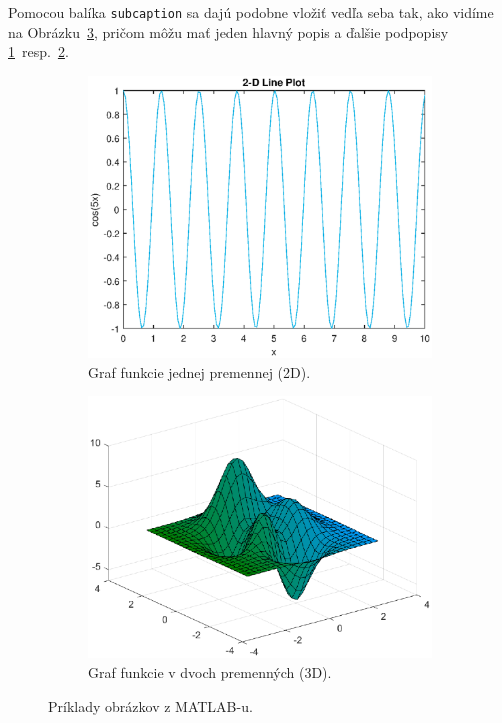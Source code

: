 Pomocou balíka \verb|subcaption| sa dajú podobne vložiť vedľa seba tak, ako vidíme na Obrázku~\ref{fig:matlab}, pričom môžu mať jeden hlavný popis a ďalšie podpopisy \ref{fig:matlab_2D}~resp.~\ref{fig:matlab_3D}.
\begin{figure}[h!]
	\centering
	\begin{subfigure}[b]{0.45\textwidth}
		\includegraphics[width=\textwidth]{matlab_2D}
		\caption{Graf funkcie jednej premennej (2D).}
		\label{fig:matlab_2D}
	\end{subfigure}
	\qquad
	\begin{subfigure}[b]{0.45\textwidth}
		\includegraphics[width=\textwidth]{matlab_3D}
		\caption{Graf funkcie v dvoch premenných (3D).}
		\label{fig:matlab_3D}
	\end{subfigure}
	\caption{Príklady obrázkov z MATLAB-u.}\label{fig:matlab}
\end{figure}

